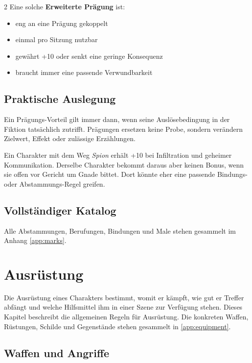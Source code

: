 \begin{multicols*}{2}
Eine solche \textbf{Erweiterte Prägung} ist:
\begin{itemize}[leftmargin=*]
\item eng an eine Prägung gekoppelt
\item einmal pro Sitzung nutzbar
\item gewährt +10 oder senkt eine geringe Konsequenz
\item braucht immer eine passende Verwundbarkeit
\end{itemize}

\subsection{Praktische Auslegung}\label{sec:praktische-auslegung}
Ein Prägungs-Vorteil gilt immer dann, wenn seine Auslösebedingung in der Fiktion tatsächlich zutrifft.
Prägungen ersetzen keine Probe, sondern verändern Zielwert, Effekt oder zulässige Erzählungen.

\begin{ruleexample}
Ein Charakter mit dem Weg \textit{Spion} erhält +10 bei Infiltration und geheimer Kommunikation.
Derselbe Charakter bekommt daraus aber keinen Bonus, wenn sie offen vor Gericht um Gnade bittet.
Dort könnte eher eine passende Bindungs- oder Abstammungs-Regel greifen.
\end{ruleexample}

\subsection{Vollständiger Katalog}\label{sec:vollstandiger-katalog}
Alle Abstammungen, Berufungen, Bindungen und Male stehen gesammelt im Anhang \cref{app:marks}.

\section{Ausrüstung}
Die Ausrüstung eines Charakters bestimmt, womit er kämpft, wie gut er Treffer abfängt und welche Hilfsmittel ihm in einer Szene zur Verfügung stehen.
Dieses Kapitel beschreibt die allgemeinen Regeln für Ausrüstung.
Die konkreten Waffen, Rüstungen, Schilde und Gegenstände stehen gesammelt in \cref{app:equipment}.

\subsection{Waffen und Angriffe}\label{sec:waffen}


\end{multicols*}

